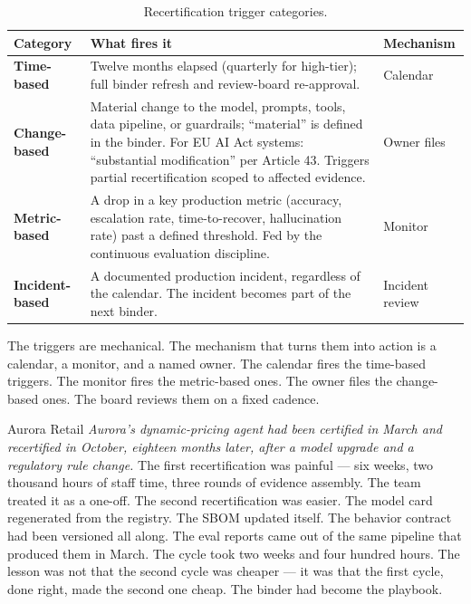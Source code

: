 \begin{table}[ht]
\centering
\caption{Recertification trigger categories.}
\small
\begin{tabularx}{\textwidth}{@{}l X l@{}}
\toprule
\textbf{Category} & \textbf{What fires it} & \textbf{Mechanism} \\
\midrule
\textbf{Time-based} & Twelve months elapsed (quarterly for high-tier); full binder refresh and review-board re-approval. & Calendar \\
\addlinespace
\textbf{Change-based} & Material change to the model, prompts, tools, data pipeline, or guardrails; ``material'' is defined in the binder. For EU AI Act systems: ``substantial modification'' per Article 43. Triggers partial recertification scoped to affected evidence. & Owner files \\
\addlinespace
\textbf{Metric-based} & A drop in a key production metric (accuracy, escalation rate, time-to-recover, hallucination rate) past a defined threshold. Fed by the continuous evaluation discipline. & Monitor \\
\addlinespace
\textbf{Incident-based} & A documented production incident, regardless of the calendar. The incident becomes part of the next binder. & Incident review \\
\bottomrule
\end{tabularx}
\end{table}

The triggers are mechanical. The mechanism that turns them into action is a calendar, a monitor, and a named owner. The calendar fires the time-based triggers. The monitor fires the metric-based ones. The owner files the change-based ones. The board reviews them on a fixed cadence.

\begin{TNinpractice}{Aurora Retail} \textit{Aurora's dynamic-pricing agent had been certified in March and recertified in October, eighteen months later, after a model upgrade and a regulatory rule change.} The first recertification was painful --- six weeks, two thousand hours of staff time, three rounds of evidence assembly. The team treated it as a one-off. The second recertification was easier. The model card regenerated from the registry. The SBOM updated itself. The behavior contract had been versioned all along. The eval reports came out of the same pipeline that produced them in March. The cycle took two weeks and four hundred hours. The lesson was not that the second cycle was cheaper --- it was that the first cycle, done right, made the second one cheap. The binder had become the playbook. \end{TNinpractice}

